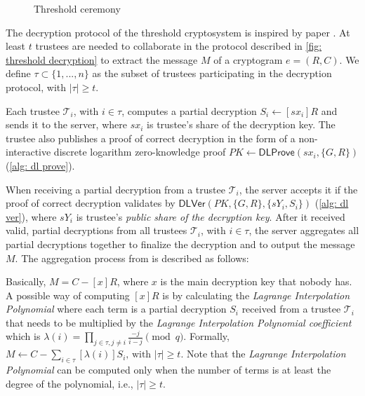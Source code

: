 \begin{figure}[ht]
    \caption{Threshold ceremony}
    \label{fig: threshold ceremony}
\end{figure}

\clearpage
The decryption protocol of the threshold cryptosystem is inspired by paper \cite{Desmedt89}. At least $t$ trustees are needed to collaborate in the protocol described in \cref{fig: threshold decryption} to extract the message $M$ of a cryptogram $e = (R, C)$. We define $\tau \subset \{ 1, ..., n \}$ as the subset of trustees participating in the decryption protocol, with $|\tau| \geq t$. 

Each trustee $\mathcal{T}_i$, with $i \in \tau$, computes a partial decryption $S_i \gets [sx_i]R$ and sends it to the server, where $sx_i$ is trustee's share of the decryption key. The trustee also publishes a proof of correct decryption in the form of a non-interactive discrete logarithm zero-knowledge proof $PK \gets \mathsf{DLProve} (sx_i, \{ G, R \})$ (\cref{alg: dl prove}).

When receiving a partial decryption from a trustee $\mathcal{T}_i$, the server accepts it if the proof of correct decryption validates by $\mathsf{DLVer} (PK, \{ G, R \}, \{ sY_i, S_i \})$ (\cref{alg: dl ver}), where $sY_i$ is trustee's \textit{public share of the decryption key}. After it received valid, partial decryptions from all trustees $\mathcal{T}_i$, with $i \in \tau$, the server aggregates all partial decryptions together to finalize the decryption and to output the message $M$. The aggregation process from \cite{Desmedt89} is described as follows:

Basically, $M = C - [x]R$, where $x$ is the main decryption key that nobody has. A possible way of computing $[x]R$ is by calculating the \textit{Lagrange Interpolation Polynomial} where each term is a partial decryption $S_i$ received from a trustee $\mathcal{T}_i$ that needs to be multiplied by the \textit{Lagrange Interpolation Polynomial coefficient} which is $\lambda(i) = \prod_{j \in \tau, j \neq i} \frac{-j}{i-j} \pmod q$. Formally, $M \gets C - \sum_{i \in \tau} [\lambda(i)]S_i\text{, with } |\tau| \geq t$. Note that the \textit{Lagrange Interpolation Polynomial} can be computed only when the number of terms is at least the degree of the polynomial, i.e., $|\tau| \geq t$.

